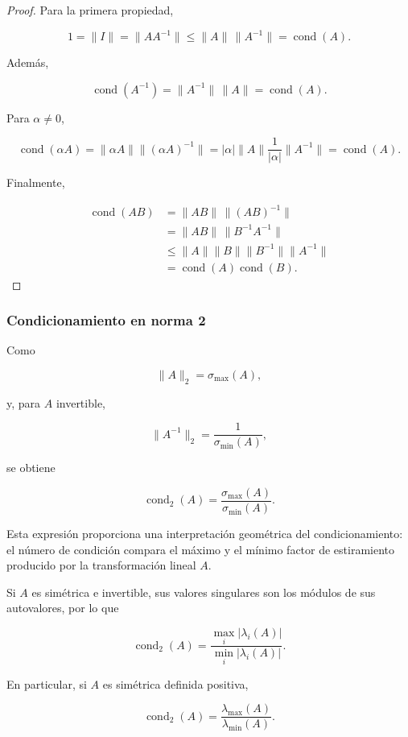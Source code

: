 \documentclass[12pt]{article}
\DeclareMathOperator{\cond}{cond}
\begin{document}
\begin{proof}
Para la primera propiedad,

\[
    1
    =
    \|I\|
    =
    \|AA^{-1}\|
    \leq
    \|A\|\,\|A^{-1}\|
    =
    \cond(A).
\]

Además,

\[
    \cond(A^{-1})
    =
    \|A^{-1}\|\,\|A\|
    =
    \cond(A).
\]

Para $\alpha\neq0$,

\[
    \cond(\alpha A)
    =
    \|\alpha A\|
    \|(\alpha A)^{-1}\|
    =
    |\alpha|\|A\|
    \frac{1}{|\alpha|}\|A^{-1}\|
    =
    \cond(A).
\]

Finalmente,

\[
\begin{aligned}
    \cond(AB)
    &=
    \|AB\|\,\|(AB)^{-1}\| \\
    &=
    \|AB\|\,\|B^{-1}A^{-1}\| \\
    &\leq
    \|A\|\|B\|
    \|B^{-1}\|\|A^{-1}\| \\
    &=
    \cond(A)\cond(B).
\end{aligned}
\]
\end{proof}


\subsubsection*{Condicionamiento en norma 2}

Como

\[
    \|A\|_2=\sigma_{\max}(A),
\]

y, para $A$ invertible,

\[
    \|A^{-1}\|_2
    =
    \frac{1}{\sigma_{\min}(A)},
\]

se obtiene

\[
    \boxed{
    \cond_2(A)
    =
    \frac{\sigma_{\max}(A)}
         {\sigma_{\min}(A)}.
    }
\]

Esta expresión proporciona una interpretación geométrica del
condicionamiento: el número de condición compara el máximo y el mínimo
factor de estiramiento producido por la transformación lineal $A$.

Si $A$ es simétrica e invertible, sus valores singulares son los
módulos de sus autovalores, por lo que

\[
    \boxed{
    \cond_2(A)
    =
    \frac{\max_i|\lambda_i(A)|}
         {\min_i|\lambda_i(A)|}.
    }
\]

En particular, si $A$ es simétrica definida positiva,

\[
    \boxed{
    \cond_2(A)
    =
    \frac{\lambda_{\max}(A)}
         {\lambda_{\min}(A)}.
    }
\]
\end{document}
